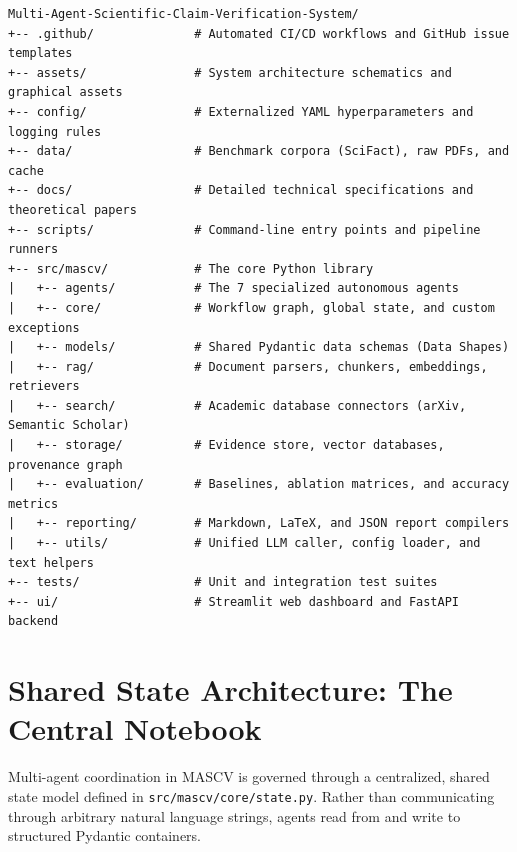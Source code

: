\documentclass[11pt,a4paper]{article}
\begin{document}
\begin{lstlisting}
Multi-Agent-Scientific-Claim-Verification-System/
+-- .github/              # Automated CI/CD workflows and GitHub issue templates
+-- assets/               # System architecture schematics and graphical assets
+-- config/               # Externalized YAML hyperparameters and logging rules
+-- data/                 # Benchmark corpora (SciFact), raw PDFs, and cache
+-- docs/                 # Detailed technical specifications and theoretical papers
+-- scripts/              # Command-line entry points and pipeline runners
+-- src/mascv/            # The core Python library
|   +-- agents/           # The 7 specialized autonomous agents
|   +-- core/             # Workflow graph, global state, and custom exceptions
|   +-- models/           # Shared Pydantic data schemas (Data Shapes)
|   +-- rag/              # Document parsers, chunkers, embeddings, retrievers
|   +-- search/           # Academic database connectors (arXiv, Semantic Scholar)
|   +-- storage/          # Evidence store, vector databases, provenance graph
|   +-- evaluation/       # Baselines, ablation matrices, and accuracy metrics
|   +-- reporting/        # Markdown, LaTeX, and JSON report compilers
|   +-- utils/            # Unified LLM caller, config loader, and text helpers
+-- tests/                # Unit and integration test suites
+-- ui/                   # Streamlit web dashboard and FastAPI backend
\end{lstlisting}

\section{Shared State Architecture: The Central Notebook}

Multi-agent coordination in MASCV is governed through a centralized, shared state model defined in \texttt{src/mascv/core/state.py}. Rather than communicating through arbitrary natural language strings, agents read from and write to structured Pydantic containers.
\end{document}
